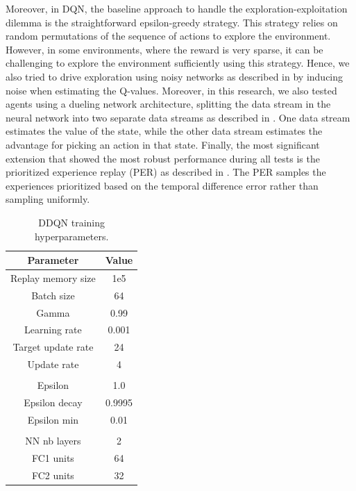 \documentclass[sn-mathphys]{sn-jnl}
\begin{document}
Moreover, in DQN, the baseline approach to handle the exploration-exploitation dilemma is the straightforward epsilon-greedy strategy. This strategy relies on random permutations of the sequence of actions to explore the environment. However, in some environments, where the reward is very sparse, it can be challenging to explore the environment sufficiently using this strategy. Hence, we also tried to drive exploration using noisy networks as described in \cite{APMOGM17} by inducing noise when estimating the Q-values. Moreover, in this research, we also tested agents using a dueling network architecture, splitting the data stream in the neural network into two separate data streams as described in \cite{WangFL15}. One data stream estimates the value of the state, while the other data stream estimates the advantage for picking an action in that state. Finally, the most significant extension that showed the most robust performance during all tests is the prioritized experience replay (PER) as described in \cite{schaul2015prioritized}. The PER samples the experiences prioritized based on the temporal difference error rather than sampling uniformly.


\begin{table}[t]
\begin{center}
    \begin{tabular}{|c c|} 
     \hline
     Parameter & Value \\ 
     \hline
     Replay memory size & 1e5 \\
     Batch size & 64 \\
     Gamma & 0.99 \\
     Learning rate & 0.001 \\
     Target update rate & 24 \\
     Update rate & 4 \\
     & \\
     Epsilon & 1.0 \\
     Epsilon decay & 0.9995 \\
     Epsilon min & 0.01 \\
     & \\
     NN nb layers & 2 \\
     FC1 units & 64 \\
     FC2 units & 32 \\
     \hline
    \end{tabular}
\end{center}
\caption{DDQN training hyperparameters.}
\label{tab:ddqn_hyperparameters}
\end{table}
\end{document}
